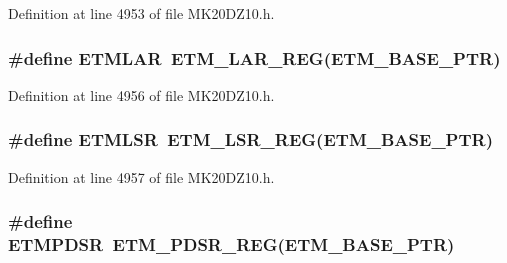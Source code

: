 Definition at line 4953 of file M\+K20\+D\+Z10.\+h.

\subsubsection[{\texorpdfstring{E\+T\+M\+L\+AR}{ETMLAR}}]{\setlength{\rightskip}{0pt plus 5cm}\#define E\+T\+M\+L\+AR~{\bf E\+T\+M\+\_\+\+L\+A\+R\+\_\+\+R\+EG}({\bf E\+T\+M\+\_\+\+B\+A\+S\+E\+\_\+\+P\+TR})}\hypertarget{group___e_t_m___register___accessor___macros_ga24bcc1ace6ac9b15797ba3cd43144eaf}{}\label{group___e_t_m___register___accessor___macros_ga24bcc1ace6ac9b15797ba3cd43144eaf}


Definition at line 4956 of file M\+K20\+D\+Z10.\+h.

\subsubsection[{\texorpdfstring{E\+T\+M\+L\+SR}{ETMLSR}}]{\setlength{\rightskip}{0pt plus 5cm}\#define E\+T\+M\+L\+SR~{\bf E\+T\+M\+\_\+\+L\+S\+R\+\_\+\+R\+EG}({\bf E\+T\+M\+\_\+\+B\+A\+S\+E\+\_\+\+P\+TR})}\hypertarget{group___e_t_m___register___accessor___macros_gabf5e9dc2c3db54e417cb720d127f8b1d}{}\label{group___e_t_m___register___accessor___macros_gabf5e9dc2c3db54e417cb720d127f8b1d}


Definition at line 4957 of file M\+K20\+D\+Z10.\+h.

\subsubsection[{\texorpdfstring{E\+T\+M\+P\+D\+SR}{ETMPDSR}}]{\setlength{\rightskip}{0pt plus 5cm}\#define E\+T\+M\+P\+D\+SR~{\bf E\+T\+M\+\_\+\+P\+D\+S\+R\+\_\+\+R\+EG}({\bf E\+T\+M\+\_\+\+B\+A\+S\+E\+\_\+\+P\+TR})}\hypertarget{group___e_t_m___register___accessor___macros_ga3b50b30633c8266415d1ef1f12c01059}{}\label{group___e_t_m___register___accessor___macros_ga3b50b30633c8266415d1ef1f12c01059}


